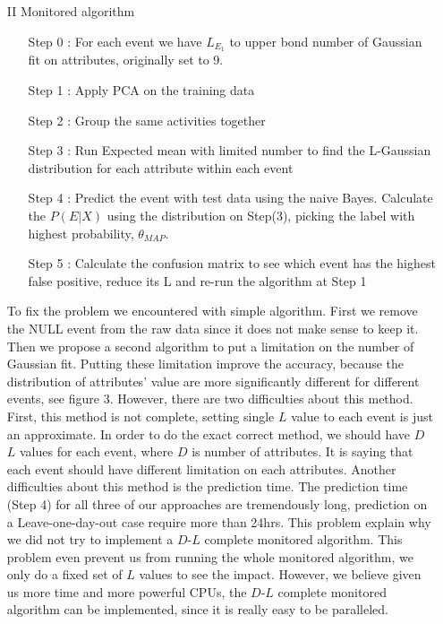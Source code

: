 \documentclass[a4paper, conference]{IEEEtran}
\begin{document}
\begin{itemize}
\item [II] Monitored algorithm
\begin{itemize}
\item [Step 0]  : For each event we have $L_{E_{1}}$ to upper bond number of Gaussian fit on attributes, originally set to 9.
\item [Step 1]  : Apply PCA on the training data
\item [Step 2]  : Group the same activities together
\item [Step 3]  : Run Expected mean with limited number to find the L-Gaussian distribution for each attribute within each  event
\item [Step 4]  : Predict the event with test data using the naive Bayes. Calculate the $P(E|X)$ using the distribution on Step(3), picking the label with highest probability, $\theta_{MAP}$.
\item [Step 5]  : Calculate the confusion matrix to see which event has the highest false positive, reduce its L and re-run the algorithm at Step 1
\end{itemize}
To fix the problem we encountered with simple algorithm. First we remove the NULL event from the raw data since it does not make sense to keep it. Then we propose a second algorithm to put a limitation on the number of Gaussian fit. Putting these limitation improve the accuracy, because  the distribution of attributes' value are more significantly different for different events, see figure 3. However, there are two difficulties about this method. First, this method is not complete, setting single $L$ value to each event is just an approximate. In order to do the exact correct method, we should have $D$ $L$ values for each event, where $D$ is  number of attributes. It is saying that each event should have different limitation on each attributes. 
Another  difficulties about this method is the prediction time. The prediction time (Step 4) for all three of our approaches are tremendously long, prediction on a Leave-one-day-out case require more than 24hrs. This problem explain why we did not try to implement a $D$-$L$ complete monitored algorithm. This problem even prevent us from running the whole monitored algorithm, we only do a fixed set of $L$ values to see the impact. However, we believe given us more time and more powerful CPUs, the $D$-$L$ complete monitored algorithm can be implemented, since it is really easy to be paralleled.\\


\end{itemize}
\end{document}
